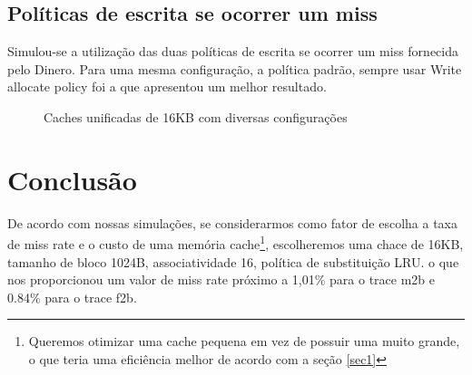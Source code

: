 \documentclass[12pt,a4paper]{article}
\begin{document}
\subsection{Políticas de escrita se ocorrer um miss}
Simulou-se a utilização das duas políticas de escrita se ocorrer um
miss fornecida pelo Dinero.
Para uma mesma configuração, a política padrão, sempre usar Write allocate policy foi a que apresentou um
melhor resultado.

\begin{figure}[h!]
\caption{Caches unificadas de 16KB com diversas configurações}
\end{figure}


\section{Conclusão}
De acordo com nossas simulações, se considerarmos como fator de
escolha a taxa de miss rate e o custo de uma memória
cache\footnote{Queremos otimizar uma cache pequena em vez de possuir
  uma muito grande, o que teria uma eficiência melhor de acordo com a
seção \ref{sec1}}, escolheremos uma chace de 16KB, tamanho
de bloco 1024B, associatividade 16, política de substituição LRU.
o que nos proporcionou um valor de miss rate próximo a 1,01\% para o
trace m2b e 0.84\% para o trace f2b.
\end{document}
